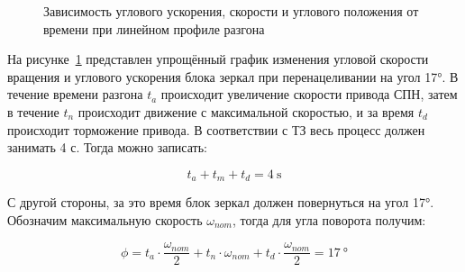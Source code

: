 \begin{figure}[ht]
	\caption{Зависимость углового ускорения, скорости и углового положения от времени при линейном профиле разгона}
	\label{fig:line_profile}
\end{figure}

На рисунке~\cref{fig:line_profile} представлен упрощённый график изменения угловой скорости вращения и углового ускорения блока зеркал при перенацеливании на угол 17°. В течение времени разгона $t_a$ происходит увеличение скорости привода СПН, затем в течение $t_n$ происходит  движение с максимальной скоростью, и за время $t_d$ происходит торможение привода. В соответствии с ТЗ весь процесс должен занимать 4 с. Тогда можно записать:

\begin{equation}
	\label{eq:eqCh2_t_move}
	t_a+t_m+t_d=\SI{4}{\second}
\end{equation}

С другой стороны, за это время блок зеркал должен повернуться на угол 17°. Обозначим максимальную скорость $\omega_{nom}$, тогда для угла поворота получим:

\begin{equation}
	\label{eq:eqCh2_t_acc}
	\phi = t_a \cdot \frac{\omega_{nom}}{2} + t_n \cdot \omega_{nom} + t_d \cdot \frac{\omega_{nom}}{2} = \SI{17}{\degree}
\end{equation}

